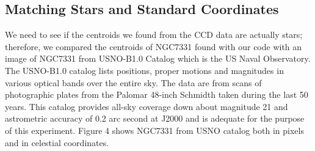 \documentclass[letterpaper,12pt]{article}
\begin{document}
                                                                                                                                                                                                                                                                                                                                                                                                                                                                                                                                                                                                                                                                                                                                                                                                                                                                                                                                                                                                                                                                         \subsection{Matching Stars and Standard Coordinates}        
We need to see if the centroids we found from the CCD data are actually stars; therefore, we compared the centroids of NGC7331 found with our code with an image of NGC7331 from USNO-B1.0 Catalog which is the US Naval Observatory. The USNO-B1.0 catalog lists positions, proper motions and magnitudes in various optical bands over the entire sky. The data are from scans of photographic plates from the Palomar 48-inch Schmidth taken during the last 50 years. This catalog provides all-sky coverage down about magnitude 21 and astrometric accuracy of 0.2 arc second at J2000 and is adequate for the purpose of this experiment. Figure 4 shows NGC7331 from USNO catalog both in pixels and in celestial coordinates.
  
\end{document}

